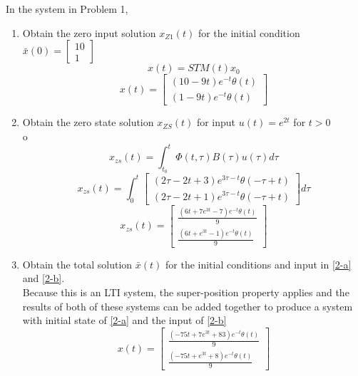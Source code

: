 \item In the system in Problem 1,
  \begin{enumerate}
  \item Obtain the zero input solution $x_{Z1}(t)$ for the initial condition
    $\bar x(0) = \begin{bmatrix}
10\\
1
\end{bmatrix}
$ \label{2-a} \\
    \begin{equation}
x(t) = STM(t)x_0\end{equation}
\begin{equation}
x(t) =\left[\begin{matrix}\left(10 - 9 t\right) e^{- t} \theta\left(t\right)\\\left(1 - 9 t\right) e^{- t} \theta\left(t\right)\end{matrix}\right]\end{equation}

  \item Obtain the zero state solution $x_{ZS}(t)$ for input $u(t) = e^{2t}$ for $t > 0$ \label{2-b}\\o
    \begin{equation}
x_{zs}(t) = \int_{t_0}^t \Phi(t,\tau)B(\tau)u(\tau)d\tau\end{equation}
\begin{equation}
x_{zs}(t) = \int_0^t\left[\begin{matrix}\left(2 \tau - 2 t + 3\right) e^{3 \tau - t} \theta\left(- \tau + t\right)\\\left(2 \tau - 2 t + 1\right) e^{3 \tau - t} \theta\left(- \tau + t\right)\end{matrix}\right]d\tau\end{equation}
\begin{equation}
x_{zs}(t) = \left[\begin{matrix}\frac{\left(6 t + 7 e^{3 t} - 7\right) e^{- t} \theta\left(t\right)}{9}\\\frac{\left(6 t + e^{3 t} - 1\right) e^{- t} \theta\left(t\right)}{9}\end{matrix}\right]\end{equation}

  \item Obtain the total solution $\bar x(t)$ for the initial conditions and input in \ref{2-a} and
    \ref{2-b}.\\
    
    Because this is an LTI system, the super-position property applies and the results of both of these systems
    can be added together to produce a system with initial state of \ref{2-a} and the input of \ref{2-b}
    \begin{equation}
x(t) = \left[\begin{matrix}\frac{\left(- 75 t + 7 e^{3 t} + 83\right) e^{- t} \theta\left(t\right)}{9}\\\frac{\left(- 75 t + e^{3 t} + 8\right) e^{- t} \theta\left(t\right)}{9}\end{matrix}\right]\end{equation}

    
  \end{enumerate}